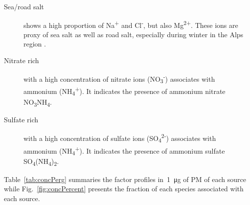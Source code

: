 \begin{description}
    \item[Sea/road salt] shows a high proportion of Na\textsuperscript{+}
        and Cl\textsuperscript{-}, but also Mg\textsuperscript{2+}. These ions
        are proxy of sea salt
        \parencite{belisCritical2013,odowdMarine1997,pioClimatology2007} as well as road salt, especially during winter in the Alps
        region \parencite{airrhone-alpesInfluence2012}.

    \item[Nitrate rich] with a high concentration of nitrate ions
        (NO\textsubscript{3}\textsuperscript{-}) associates with ammonium
        (NH\textsubscript{4}\textsuperscript{+}). It indicates the presence of
        ammonium nitrate NO\textsubscript{3}NH\textsubscript{4}.

    \item[Sulfate rich] with a high concentration of sulfate ions
        (SO\textsubscript{4}\textsuperscript{2-}) associates with ammonium
        (NH\textsubscript{4}\textsuperscript{+}). It indicates the presence of
        ammonium sulfate
        SO\textsubscript{4}(NH\textsubscript{4})\textsubscript{2}.

\end{description}

Table~\ref{tab:concPerg} summaries the factor profiles in~\SI{1}{\micro\g} of PM
of each source while Fig.~\ref{fig:concPercent} presents the fraction of each
species associated with each source.

